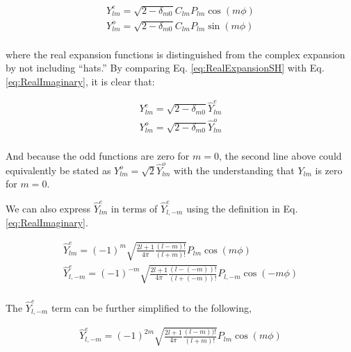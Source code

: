 \documentclass[10pt]{article}
\begin{document}
\begin{flushleft}
\begin{tcolorbox}[breakable]
\begin{equation}
\label{eq:RealExpansionSH}
\begin{aligned}
Y_{lm}^e=\sqrt{2-\delta_{m0}}C_{lm}P_{lm}\cos{(m\phi)}\\
Y_{lm}^o=\sqrt{2-\delta_{m0}}C_{lm}P_{lm}\sin{(m\phi)}\\
\end{aligned}
\end{equation}

where the real expansion functions is distinguished from the complex expansion by not including ``hats.'' By comparing Eq. \eqref{eq:RealExpansionSH} with Eq. \eqref{eq:RealImaginary}, it is clear that:

\begin{equation}
\label{eq:HattoNoHat}
\begin{aligned}
Y_{lm}^e=\sqrt{2-\delta_{m0}}\hat{Y}_{lm}^e\\
Y_{lm}^o=\sqrt{2-\delta_{m0}}\hat{Y}_{lm}^o\\
\end{aligned}
\end{equation}

And because the odd functions are zero for \(m=0\), the second line above could equivalently be stated as \(Y_{lm}^o=\sqrt{2}\hat{Y}_{lm}^o\) with the understanding that \(Y_{lm}\) is zero for \(m=0\). 

\end{tcolorbox}



\begin{tcolorbox}[breakable]
We can also express \(\hat{Y}_{lm}^e\) in terms of \(\hat{Y}_{l,-m}^e\) using the definition in Eq. \eqref{eq:RealImaginary}. 

\begin{equation}
\begin{aligned}
\hat{Y}_{lm}^e=(-1)^m\sqrt{\frac{2l+1}{4\pi}\frac{(l-m)!}{(l+m)!}}P_{lm}\cos{(m\phi)}\\
\hat{Y}_{l,-m}^e=(-1)^{-m}\sqrt{\frac{2l+1}{4\pi}\frac{(l-(-m))!}{(l+(-m))!}}P_{l,-m}\cos{(-m\phi)}\\
\end{aligned}
\end{equation}

The \(\hat{Y}_{l,-m}^e\) term can be further simplified to the following, 

\begin{equation}
\begin{aligned}
\hat{Y}_{l,-m}^e=(-1)^{2m}\sqrt{\frac{2l+1}{4\pi}\frac{(l-m))!}{(l+m)!}}P_{lm}\cos{(m\phi)}\\
\end{aligned}
\end{equation}


\end{tcolorbox}
\end{flushleft}
\end{document}
